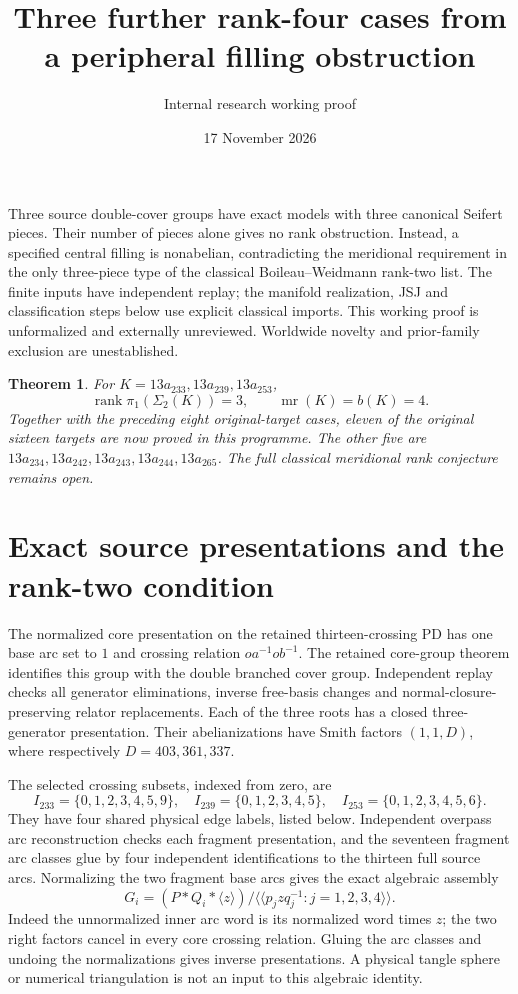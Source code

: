 \documentclass[11pt]{article}
\title{Three further rank-four cases from a peripheral filling obstruction}
\author{Internal research working proof}
\date{17 November 2026}
\newtheorem{theorem}{Theorem}
\newcommand{\rank}{\operatorname{rank}}
\newcommand{\mr}{\operatorname{mr}}
\begin{document}
\maketitle

Three source double-cover groups have exact models with three canonical
Seifert pieces. Their number of pieces alone gives no rank obstruction.
Instead, a specified central filling is nonabelian, contradicting the
meridional requirement in the only three-piece type of the classical
Boileau--Weidmann rank-two list. The finite inputs have independent replay;
the manifold realization, JSJ and classification steps below use explicit
classical imports. This working proof is unformalized and externally
unreviewed. Worldwide novelty and prior-family exclusion are unestablished.

\begin{theorem}
For $K=13a_{233},13a_{239},13a_{253}$,
\[
 \rank\pi_1(\Sigma_2(K))=3,\qquad \mr(K)=b(K)=4.
\]
Together with the preceding eight original-target cases, eleven of the
original sixteen targets are now proved in this programme. The other five
are $13a_{234},13a_{242},13a_{243},13a_{244},13a_{265}$. The full classical
meridional rank conjecture remains open.
\end{theorem}

\section{Exact source presentations and the rank-two condition}

The normalized core presentation on the retained thirteen-crossing PD has
one base arc set to $1$ and crossing relation $o a^{-1}o b^{-1}$.
The retained core-group theorem identifies this group with the double
branched cover group. Independent replay checks all generator eliminations,
inverse free-basis changes and normal-closure-preserving relator replacements.
Each of the three roots has a closed three-generator presentation.
Their abelianizations have Smith factors $(1,1,D)$, where respectively
$D=403,361,337$.

The selected crossing subsets, indexed from zero, are
\[
 I_{233}=\{0,1,2,3,4,5,9\},\quad
 I_{239}=\{0,1,2,3,4,5\},\quad
 I_{253}=\{0,1,2,3,4,5,6\}.
\]
They have four shared physical edge labels, listed below. Independent
overpass arc reconstruction checks each fragment presentation, and the
seventeen fragment arc classes glue by four independent identifications to
the thirteen full source arcs. Normalizing the two fragment base arcs gives
the exact algebraic assembly
\begin{equation}\label{eq:assembly}
 G_i=(P*Q_i*\langle z\rangle)/
 \langle\!\langle p_jzq_j^{-1}:j=1,2,3,4\rangle\!\rangle.
\end{equation}
Indeed the unnormalized inner arc word is its normalized word times $z$;
the two right factors cancel in every core crossing relation. Gluing the
arc classes and undoing the normalizations gives inverse presentations.
A physical tangle sphere or numerical triangulation is not an input to
this algebraic identity.
\end{document}
